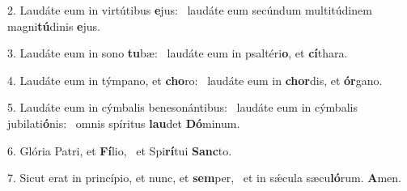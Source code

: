 2. Laudáte eum in virtútibus \textbf{e}jus: \ast\  laudáte eum secúndum multitúdinem magni\textbf{tú}dinis \textbf{e}jus.\

3. Laudáte eum in sono \textbf{tu}bæ: \ast\  laudáte eum in psaltéri\textbf{o}, et \textbf{cí}thara.\

4. Laudáte eum in týmpano, et \textbf{cho}ro: \ast\  laudáte eum in \textbf{chor}dis, et \textbf{ór}gano.\

5. Laudáte eum in cýmbalis benesonántibus: \dag\  laudáte eum in cýmbalis jubilati\textbf{ó}nis: \ast\  omnis spíritus \textbf{lau}det \textbf{Dó}minum.\

6. Glória Patri, et \textbf{Fí}lio, \ast\  et Spi\textbf{rí}tui \textbf{Sanc}to.\

7. Sicut erat in princípio, et nunc, et \textbf{sem}per, \ast\  et in sǽcula sæcu\textbf{ló}rum. \textbf{A}men.\

